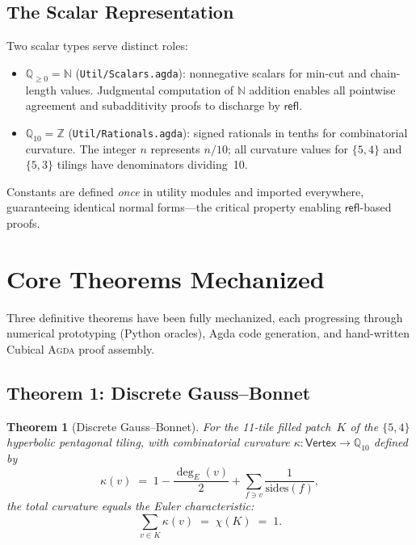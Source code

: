 \documentclass[11pt, a4paper]{article}
\theoremstyle{plain}
\newtheorem{theorem}{Theorem}[section]
\theoremstyle{definition}
\newcommand{\Agda}{\textsc{Agda}}
\newcommand{\refl}{\mathsf{refl}}
\newcommand{\Qgeq}{\mathbb{Q}_{\geq 0}}
\newcommand{\Qten}{\mathbb{Q}_{10}}
\newcommand{\NN}{\mathbb{N}}
\newcommand{\ZZ}{\mathbb{Z}}
\begin{document}
\subsection{The Scalar Representation}

Two scalar types serve distinct roles:
\begin{itemize}[nosep]
  \item $\Qgeq = \NN$ (\texttt{Util/Scalars.agda}): nonnegative
    scalars for min-cut and chain-length values.  Judgmental
    computation of $\NN$ addition enables all pointwise agreement
    and subadditivity proofs to discharge by $\refl$.
  \item $\Qten = \ZZ$ (\texttt{Util/Rationals.agda}): signed
    rationals in tenths for combinatorial curvature.  The integer
    $n$ represents $n/10$; all curvature values for $\{5,4\}$ and
    $\{5,3\}$ tilings have denominators dividing~10.
\end{itemize}

Constants are defined \emph{once} in utility modules and imported
everywhere, guaranteeing identical normal forms---the critical
property enabling $\refl$-based proofs.

\section{Core Theorems Mechanized}
\label{sec:theorems}

Three definitive theorems have been fully mechanized, each
progressing through numerical prototyping (Python oracles),
Agda code generation, and hand-written Cubical \Agda{} proof
assembly.

\subsection{Theorem 1: Discrete Gauss--Bonnet}
\label{sec:thm1}

\begin{theorem}[Discrete Gauss--Bonnet]
For the 11-tile filled patch~$K$ of the $\{5,4\}$ hyperbolic
pentagonal tiling, with combinatorial curvature
$\kappa : \mathsf{Vertex} \to \Qten$ defined by
\[
  \kappa(v) \;=\; 1 - \frac{\deg_E(v)}{2}
  + \sum_{f \ni v} \frac{1}{\mathrm{sides}(f)},
\]
the total curvature equals the Euler characteristic:
\[
  \sum_{v \in K} \kappa(v) \;=\; \chi(K) \;=\; 1.
\]
\end{theorem}
\end{document}
